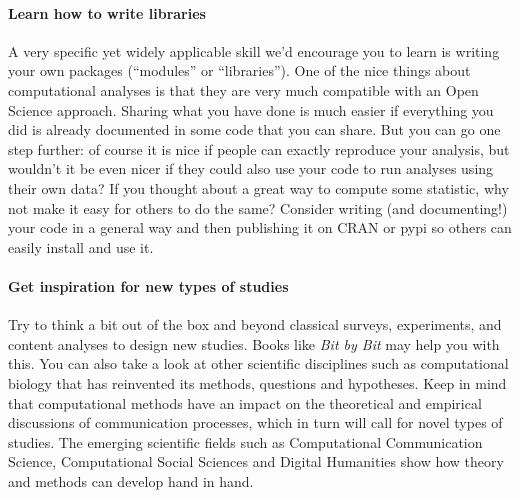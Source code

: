 \paragraph{Learn how to write libraries} A very specific yet widely applicable skill we'd encourage you to learn is writing your own packages (``modules'' or ``libraries''). One of the nice things about computational analyses is that they are very much compatible with an Open Science approach. Sharing what you have done is much easier if everything you did is already documented in some code that you can share. But you can go one step further: of course it is nice if people can exactly reproduce your analysis, but wouldn't it be even nicer if they could also use your code to run analyses using their own data?
If you thought about a great way to compute some statistic, why not make it easy for others to do the same?
Consider writing (and documenting!) your code  in a general way and then publishing it on CRAN or pypi so others can easily install and use it.

\paragraph{Get inspiration for new types of studies} Try to think a bit out of the box and beyond classical surveys, experiments, and content analyses to design new studies. Books like \emph{Bit by Bit} \cite{Salganik2019} may help you with this. You can also take a look at other scientific disciplines such as computational biology that has reinvented its methods, questions and hypotheses. Keep in mind that computational methods have an impact on the theoretical and empirical discussions of communication processes, which in turn will call for novel types of studies. The emerging scientific fields such as Computational Communication Science, Computational Social Sciences and Digital Humanities show how theory and methods can develop hand in hand.

